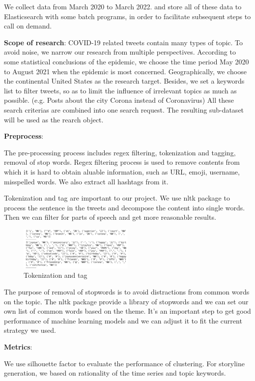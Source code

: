 We collect data from March 2020 to March 2022. and store all of these data
to Elasticsearch with some batch programs, in order to facilitate subsequent steps to call on demand. 

{\bf Scope of research}:
COVID-19 related tweets contain many types of topic. To avoid noise, we narrow our research from multiple perspectives. According to some statistical conclusions of the epidemic, we choose the time period May 2020 to August 2021 when the epidemic is most concerned. Geographically, we choose the continental United States as the research target. Besides, we set a keywords list to filter tweets, so as to limit the influence of irrelevant topics as much as possible. (e.g. Posts about the city Corona instead of Coronavirus) All these search criterias are combined into one search request. 
The resulting sub-dataset will be used as the rearch object.

{\bf Preprocess}: 

The pre-processing process includes regex filtering, tokenization and tagging,
removal of stop words. Regex
filtering process is used to remove contents from which it is hard to obtain aluable information, such as URL, emoji, username, misspelled words. We also extract all hashtags from it.  

Tokenization and tag are important to our project. We use nltk package to
process the sentence in the tweets and decompose the content into single
words. Then we can filter for parts of speech and get more reasonable
results. 
\begin{figure}[h]
\centering
\includegraphics[width=0.5\textwidth]{imgs/tokenization.png}
\caption{Tokenization and tag}
\label{fig:Tokenization and tag}
\end{figure}
The purpose of removal of stopwords is to avoid distractions from common words
on the topic. The nltk package provide a library of stopwords and we can set
our own list of common words based on the theme. It's an important step to
get good performance of machine learning models and we can adjust it to fit
the current strategy we used.

{\bf Metrics}:

We use silhouette factor to evaluate the performance of clustering. For storyline generation, we based on rationality of the time series and topic keywords. 

